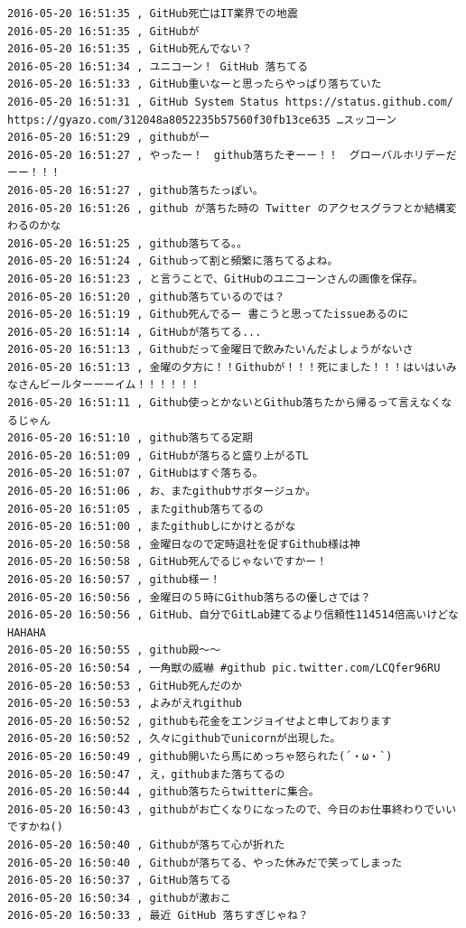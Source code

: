 \begin{verbatim}
2016-05-20 16:51:35 , GitHub死亡はIT業界での地震
2016-05-20 16:51:35 , GitHubが
2016-05-20 16:51:35 , GitHub死んでない？
2016-05-20 16:51:34 , ユニコーン！ GitHub 落ちてる
2016-05-20 16:51:33 , GitHub重いなーと思ったらやっぱり落ちていた
2016-05-20 16:51:31 , GitHub System Status https://status.github.com/  
https://gyazo.com/312048a8052235b57560f30fb13ce635 …スッコーン
2016-05-20 16:51:29 , githubがー
2016-05-20 16:51:27 , やったー！　github落ちたぞーー！！　グローバルホリデーだーー！！！
2016-05-20 16:51:27 , github落ちたっぽい。
2016-05-20 16:51:26 , github が落ちた時の Twitter のアクセスグラフとか結構変わるのかな
2016-05-20 16:51:25 , github落ちてる。。
2016-05-20 16:51:24 , Githubって割と頻繁に落ちてるよね。
2016-05-20 16:51:23 , と言うことで、GitHubのユニコーンさんの画像を保存。
2016-05-20 16:51:20 , github落ちているのでは？
2016-05-20 16:51:19 , Github死んでるー 書こうと思ってたissueあるのに
2016-05-20 16:51:14 , GitHubが落ちてる...
2016-05-20 16:51:13 , Githubだって金曜日で飲みたいんだよしょうがないさ
2016-05-20 16:51:13 , 金曜の夕方に！！Githubが！！！死にました！！！はいはいみなさんビールターーーイム！！！！！！
2016-05-20 16:51:11 , Github使っとかないとGithub落ちたから帰るって言えなくなるじゃん
2016-05-20 16:51:10 , github落ちてる定期
2016-05-20 16:51:09 , GitHubが落ちると盛り上がるTL
2016-05-20 16:51:07 , GitHubはすぐ落ちる。
2016-05-20 16:51:06 , お、またgithubサボタージュか。
2016-05-20 16:51:05 , またgithub落ちてるの
2016-05-20 16:51:00 , またgithubしにかけとるがな
2016-05-20 16:50:58 , 金曜日なので定時退社を促すGithub様は神
2016-05-20 16:50:58 , GitHub死んでるじゃないですかー！
2016-05-20 16:50:57 , github様ー！
2016-05-20 16:50:56 , 金曜日の５時にGithub落ちるの優しさでは？
2016-05-20 16:50:56 , GitHub、自分でGitLab建てるより信頼性114514倍高いけどなHAHAHA
2016-05-20 16:50:55 , github殿〜〜
2016-05-20 16:50:54 , 一角獣の威嚇 #github pic.twitter.com/LCQfer96RU
2016-05-20 16:50:53 , GitHub死んだのか
2016-05-20 16:50:53 , よみがえれgithub
2016-05-20 16:50:52 , githubも花金をエンジョイせよと申しております
2016-05-20 16:50:52 , 久々にgithubでunicornが出現した。
2016-05-20 16:50:49 , github開いたら馬にめっちゃ怒られた(´・ω・`)
2016-05-20 16:50:47 , え，githubまた落ちてるの
2016-05-20 16:50:44 , github落ちたらtwitterに集合。
2016-05-20 16:50:43 , githubがお亡くなりになったので、今日のお仕事終わりでいいですかね()
2016-05-20 16:50:40 , Githubが落ちて心が折れた
2016-05-20 16:50:40 , Githubが落ちてる、やった休みだで笑ってしまった
2016-05-20 16:50:37 , GitHub落ちてる
2016-05-20 16:50:34 , githubが激おこ
2016-05-20 16:50:33 , 最近 GitHub 落ちすぎじゃね？

\end{verbatim}
